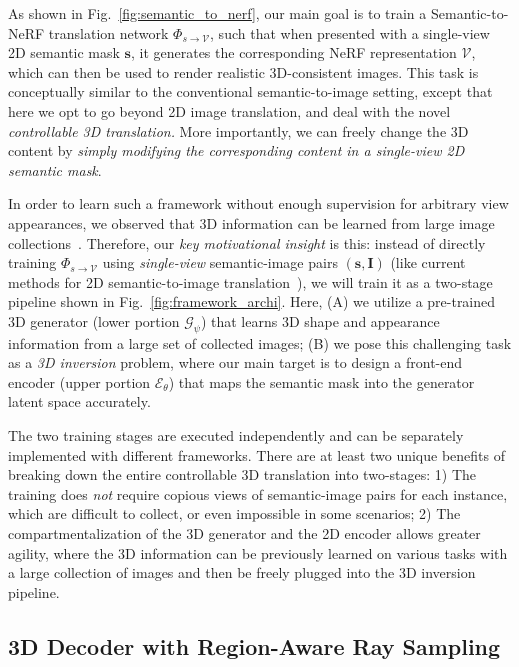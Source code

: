 \documentclass[runningheads]{llncs}
\begin{document}
As shown in Fig.~\ref{fig:semantic_to_nerf}, our main goal is to train a Semantic-to-NeRF translation network $\Phi_{s\to\mathcal{V}}$, such that when presented with a single-view 2D semantic mask $\mathbf{s}$, it generates the corresponding NeRF representation $\mathcal{V}$, which can then be used to render realistic 3D-consistent images. This task is conceptually similar to the conventional semantic-to-image setting, except that here we opt to go beyond 2D image translation, and deal with the novel \emph{controllable 3D translation.} More importantly, we can freely change the 3D content by \emph{simply modifying the corresponding content in a single-view 2D semantic mask}.




In order to learn such a framework without enough supervision for arbitrary view appearances, we observed that 3D information can be learned from large image collections~\cite{kanazawa2018learning,chan2021pi,chan2021efficient}. Therefore, our \emph{key motivational insight} is this: instead of directly training $\Phi_{s\to\mathcal{V}}$ using \emph{single-view} semantic-image pairs $(\mathbf{s},\mathbf{I})$ (like current methods for 2D semantic-to-image translation~\cite{wang2018high,park2019semantic}), we will train it as a two-stage pipeline shown in Fig.~\ref{fig:framework_archi}. Here, (A) we utilize a pre-trained 3D generator (lower portion $\mathcal{G}_\psi$) that learns 3D shape and appearance information from a large set of collected images; (B) we pose this challenging task as a \emph{3D inversion} problem, where our main target is to design a front-end encoder (upper portion $\mathcal{E}_\theta$) that maps the semantic mask into the generator latent space accurately. 

The two training stages are executed independently and can be separately implemented with different frameworks. There are at least two unique benefits of breaking down the entire controllable 3D translation into two-stages: 1) The training does \emph{not} require copious views of semantic-image pairs for each instance, which are difficult to collect, or even impossible in some scenarios; 2) The compartmentalization of the 3D generator and the 2D encoder allows greater agility, where the 3D information can be previously learned on various tasks with a large collection of images and then be freely plugged into the 3D inversion pipeline.



\subsection{3D Decoder with Region-Aware Ray Sampling}
\end{document}
